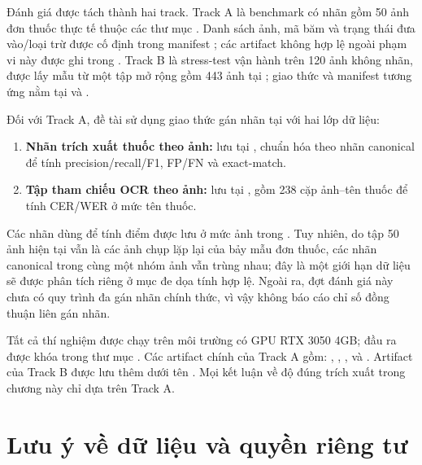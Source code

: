 \documentclass[12pt,a4paper]{report}
\begin{document}
Đánh giá được tách thành hai track. Track A là benchmark có nhãn gồm 50 ảnh đơn thuốc thực tế thuộc các thư mục . Danh sách ảnh, mã băm và trạng thái đưa vào/loại trừ được cố định trong manifest ; các artifact không hợp lệ ngoài phạm vi này được ghi trong . Track B là stress-test vận hành trên 120 ảnh không nhãn, được lấy mẫu từ một tập mở rộng gồm 443 ảnh tại ; giao thức và manifest tương ứng nằm tại  và .

Đối với Track A, đề tài sử dụng giao thức gán nhãn tại  với hai lớp dữ liệu:

\begin{enumerate}[label=\arabic*.]
    \item \textbf{Nhãn trích xuất thuốc theo ảnh:} lưu tại , chuẩn hóa theo nhãn canonical để tính precision/recall/F1, FP/FN và exact-match.
    \item \textbf{Tập tham chiếu OCR theo ảnh:} lưu tại , gồm 238 cặp ảnh--tên thuốc để tính CER/WER ở mức tên thuốc.
\end{enumerate}

Các nhãn dùng để tính điểm được lưu ở mức ảnh trong . Tuy nhiên, do tập 50 ảnh hiện tại vẫn là các ảnh chụp lặp lại của bảy mẫu đơn thuốc, các nhãn canonical trong cùng một nhóm ảnh vẫn trùng nhau; đây là một giới hạn dữ liệu sẽ được phân tích riêng ở mục đe dọa tính hợp lệ. Ngoài ra, đợt đánh giá này chưa có quy trình đa gán nhãn chính thức, vì vậy không báo cáo chỉ số đồng thuận liên gán nhãn.

Tất cả thí nghiệm được chạy trên môi trường có GPU RTX 3050 4GB; đầu ra được khóa trong thư mục . Các artifact chính của Track A gồm: , , ,  và . Artifact của Track B được lưu thêm dưới tên . Mọi kết luận về độ đúng trích xuất trong chương này chỉ dựa trên Track A.

\section{Lưu ý về dữ liệu và quyền riêng tư}
\end{document}
